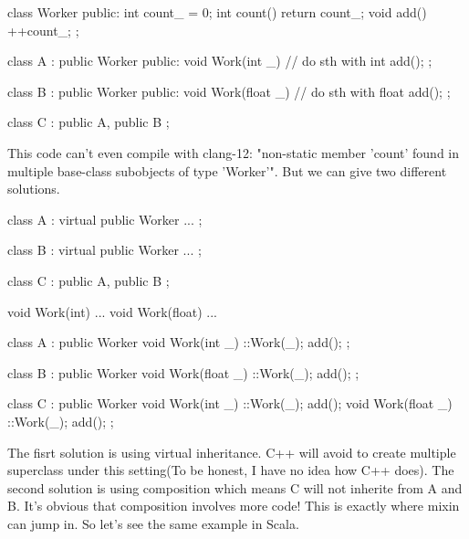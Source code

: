 \documentclass{article}
\begin{document}
\begin{minipage}[t]{0.48\textwidth}
\begin{CPPCode}
class Worker {
 public:
  int count_ = 0;
  int count() { return count_; }
  void add() { ++count_; }
};

class A : public Worker {
 public:
  void Work(int _) {
    // do sth with int
    add();
  }
};
\end{CPPCode}
\end{minipage}
\begin{minipage}[t]{0.48\textwidth}
\begin{CPPCode}
class B : public Worker {
 public:
  void Work(float _) {
    // do sth with float
    add();
  }
};

class C : public A, public B {};
\end{CPPCode}
\end{minipage}

This code can't even compile with clang-12: "non-static member 'count' found in multiple base-class subobjects of type 'Worker'". But we can give two different solutions.

\begin{minipage}[t]{0.48\textwidth}
\begin{CPPCode}
class A : virtual public Worker {
  ...
};

class B : virtual public Worker {
  ...
};

class C : public A, public B {};
\end{CPPCode}
\end{minipage}
\begin{minipage}[t]{0.48\textwidth}
\begin{CPPCode}[Composition]
void Work(int) { ... }
void Work(float) { ... }

class A : public Worker {
  void Work(int _) { ::Work(_); add(); }
};

class B : public Worker {
  void Work(float _) { ::Work(_); add(); }
};

class C : public Worker {
  void Work(int _) { ::Work(_); add(); }
  void Work(float _) { ::Work(_); add(); }
};
\end{CPPCode}
\end{minipage}

The fisrt solution is using virtual inheritance. C++ will avoid to create multiple superclass under this setting(To be honest, I have no idea how C++ does). The second solution is using composition which means C will not inherite from A and B. It's obvious that composition involves more code! This is exactly where mixin can jump in. So let's see the same example in Scala.
\end{document}
